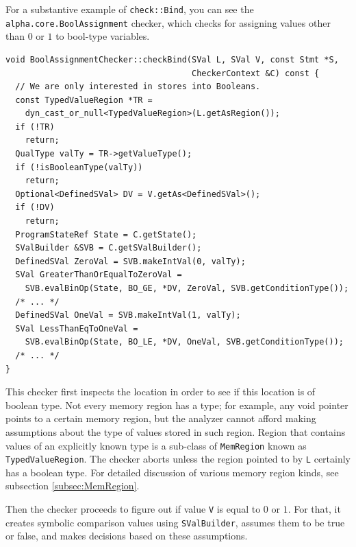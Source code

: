 \documentclass[a4paper,12pt]{article}
\newenvironment{nobr}{\begin{minipage}{\textwidth}\setlength\parskip{1em}
}{\end{minipage}\ignorespacesafterend}
\begin{document}
For a substantive example of \lstinline|check::Bind|, you can see the \lstinline|alpha.core.BoolAssignment| checker, which checks for assigning values other than $0$ or $1$ to bool-type variables.

\begin{nobr}
\begin{lstlisting}[style=cplusplus]
void BoolAssignmentChecker::checkBind(SVal L, SVal V, const Stmt *S,
                                      CheckerContext &C) const {
  // We are only interested in stores into Booleans.
  const TypedValueRegion *TR =
    dyn_cast_or_null<TypedValueRegion>(L.getAsRegion());
  if (!TR)
    return;
  QualType valTy = TR->getValueType();
  if (!isBooleanType(valTy))
    return;
  Optional<DefinedSVal> DV = V.getAs<DefinedSVal>();
  if (!DV)
    return;
  ProgramStateRef State = C.getState();
  SValBuilder &SVB = C.getSValBuilder();
  DefinedSVal ZeroVal = SVB.makeIntVal(0, valTy);
  SVal GreaterThanOrEqualToZeroVal =
    SVB.evalBinOp(State, BO_GE, *DV, ZeroVal, SVB.getConditionType());
  /* ... */
  DefinedSVal OneVal = SVB.makeIntVal(1, valTy);
  SVal LessThanEqToOneVal =
    SVB.evalBinOp(State, BO_LE, *DV, OneVal, SVB.getConditionType());
  /* ... */
}
\end{lstlisting}
\end{nobr}

This checker first inspects the location in order to see if this location is of boolean type. Not every memory region has a type; for example, any void pointer points to a certain memory region, but the analyzer cannot afford making assumptions about the type of values stored in such region. Region that contains values of an explicitly known type is a sub-class of \lstinline|MemRegion| known as \lstinline|TypedValueRegion|. The checker aborts unless the region pointed to by \lstinline|L| certainly has a boolean type. For detailed discussion of various memory region kinds, see subsection \ref{subsec:MemRegion}.

Then the checker proceeds to figure out if value \lstinline|V| is equal to $0$ or $1$. For that, it creates symbolic comparison values using \lstinline|SValBuilder|, assumes them to be true or false, and makes decisions based on these assumptions.
\end{document}
